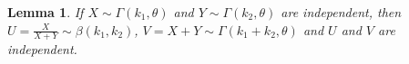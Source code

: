 \documentclass[journal,12pt,onecolumn]{IEEEtran}
\newtheorem{lemma}{Lemma}
\begin{document}
\begin{lemma} If $X \sim \Gamma(k_1, \theta)$ and $Y \sim \Gamma(k_2, \theta)$ are independent, then $U = \frac{X}{X+Y} \sim \beta(k_1,k_2)$, $V = X + Y \sim \Gamma(k_{1} + k_{2}, \theta)$ and $U$ and $V$ are independent.
\end{lemma}


\end{document}
